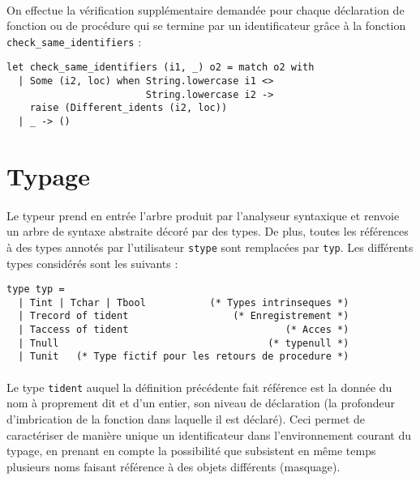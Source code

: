 \documentclass[a4paper,12pt]{article}
\begin{document}
\paragraph*{}
On effectue la vérification supplémentaire demandée pour chaque déclaration de fonction ou de procédure qui se termine par un identificateur grâce à la fonction \texttt{check\_same\_identifiers} :

\begin{lstlisting}
let check_same_identifiers (i1, _) o2 = match o2 with
  | Some (i2, loc) when String.lowercase i1 <> 
                        String.lowercase i2 ->
    raise (Different_idents (i2, loc))
  | _ -> ()
\end{lstlisting}

\section{Typage}

\paragraph*{}
Le typeur prend en entrée l'arbre produit par l'analyseur syntaxique et renvoie un arbre de syntaxe abstraite décoré par des types. De plus, toutes les références à des types annotés par l'utilisateur \texttt{stype} sont remplacées par \texttt{typ}. Les différents types considérés sont les suivants :

\begin{lstlisting}
type typ =
  | Tint | Tchar | Tbool           (* Types intrinseques *)
  | Trecord of tident                  (* Enregistrement *)
  | Taccess of tident                           (* Acces *)
  | Tnull                                    (* typenull *)
  | Tunit   (* Type fictif pour les retours de procedure *)
\end{lstlisting}

\paragraph*{}
Le type \texttt{tident} auquel la définition précédente fait référence est la donnée du nom à proprement dit et d'un entier, son niveau de déclaration (la profondeur d'imbrication de la fonction dans laquelle il est déclaré). Ceci permet de caractériser de manière unique un identificateur dans l'environnement courant du typage, en prenant en compte la possibilité que subsistent en même temps plusieurs noms faisant référence à des objets différents (masquage).
\end{document}
